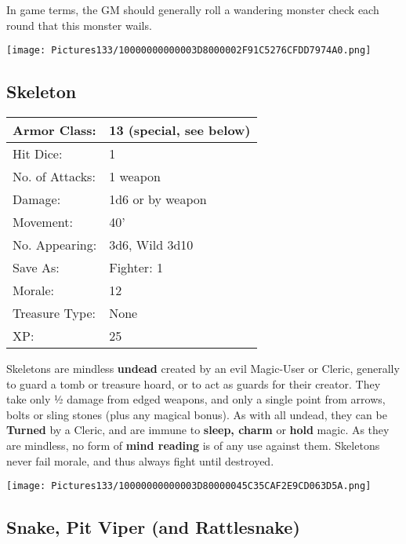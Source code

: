 \documentclass[a4paper,twoside,openany,10pt]{book}
\begin{document}
\begin{multicols}{2}
In game terms, the GM should generally roll a wandering monster check each
round that this monster wails.

\begin{center} \texttt{[image: Pictures133/10000000000003D8000002F91C5276CFDD7974A0.png]} \end{center}


\subsection*{Skeleton}\label{skeleton}

\begin{tabularx}{0.50\textwidth}{@{}lX@{}}
Armor Class: & 13 (special, see below) \\\hline
Hit Dice: & 1 \\\hline
No. of Attacks: & 1 weapon \\\hline
Damage: & 1d6 or by weapon \\\hline
Movement: & 40' \\\hline
No. Appearing: & 3d6, Wild 3d10 \\\hline
Save As: & Fighter: 1 \\\hline
Morale: & 12 \\\hline
Treasure Type: & None \\\hline
XP: & 25 \\\hline
\end{tabularx}\medskip

Skeletons
are mindless \textbf{undead} created by an evil Magic-User or Cleric, generally to guard a tomb or treasure hoard, or to act as guards for their creator. They take only ½ damage from edged weapons, and only a single point from arrows, bolts or sling stones (plus any magical bonus). As with all undead, they can be \textbf{Turned} by a Cleric, and are immune to \textbf{sleep, charm} or \textbf{hold} magic. As they are mindless, no form of \textbf{mind reading} is of any use against them. Skeletons never fail morale, and thus always fight until destroyed.

\begin{center} \texttt{[image: Pictures133/10000000000003D80000045C35CAF2E9CD063D5A.png]} \end{center}


\subsection*{Snake, Pit Viper (and Rattlesnake)}\label{snake-pit-viper-and-rattlesnake}


\end{multicols}
\end{document}
